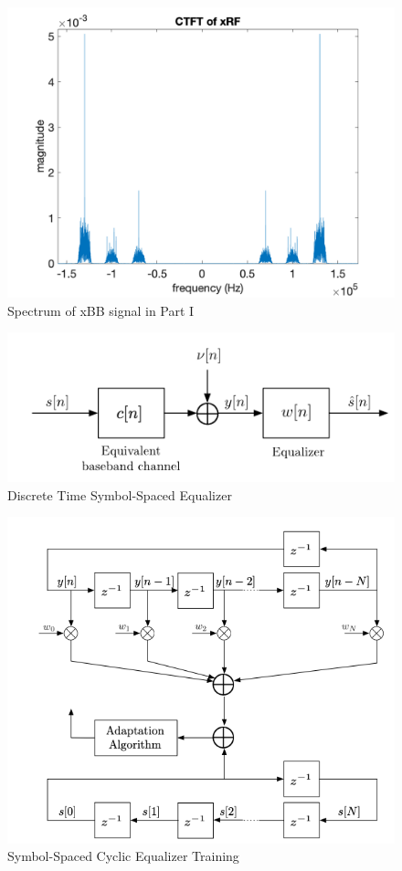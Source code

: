 \begin{figure}[h!]
    \centering
    \includegraphics[scale=0.4]{figures/xRF1 spectrum.png}
    \caption{Spectrum of xBB signal in Part I}
    \label{fig:xbb_partI}
\end{figure}
\begin{figure}[h!]
    \centering
    \includegraphics[scale=1.5]{figures/discrete_time_symbol_spaced.png}
    \caption{Discrete Time Symbol-Spaced Equalizer}
    \label{fig:symbol-spaced}
\end{figure}
\begin{figure}[h!]
    \centering
    \includegraphics[scale=1]{figures/symbol_spaced_cyclic.png}
    \caption{Symbol-Spaced Cyclic Equalizer Training}
    \label{fig:symbol-cyclic}
\end{figure}
